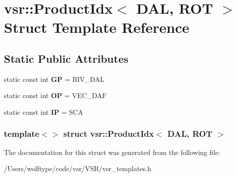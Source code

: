 \hypertarget{structvsr_1_1_product_idx_3_01_d_a_l_00_01_r_o_t_01_4}{\section{vsr\-:\-:Product\-Idx$<$ D\-A\-L, R\-O\-T $>$ Struct Template Reference}
\label{structvsr_1_1_product_idx_3_01_d_a_l_00_01_r_o_t_01_4}
}
\subsection*{Static Public Attributes}
\begin{DoxyCompactItemize}
\item 
\hypertarget{structvsr_1_1_product_idx_3_01_d_a_l_00_01_r_o_t_01_4_a36591015706e6aabcc73660864e1f78d}{static const int {\bfseries G\-P} = B\-I\-V\-\_\-\-D\-A\-L}\label{structvsr_1_1_product_idx_3_01_d_a_l_00_01_r_o_t_01_4_a36591015706e6aabcc73660864e1f78d}

\item 
\hypertarget{structvsr_1_1_product_idx_3_01_d_a_l_00_01_r_o_t_01_4_af5b7202d8acead7481998c81165f532b}{static const int {\bfseries O\-P} = V\-E\-C\-\_\-\-D\-A\-F}\label{structvsr_1_1_product_idx_3_01_d_a_l_00_01_r_o_t_01_4_af5b7202d8acead7481998c81165f532b}

\item 
\hypertarget{structvsr_1_1_product_idx_3_01_d_a_l_00_01_r_o_t_01_4_af611aaed9b24fcb1b7c36dc6ba5f0ef3}{static const int {\bfseries I\-P} = S\-C\-A}\label{structvsr_1_1_product_idx_3_01_d_a_l_00_01_r_o_t_01_4_af611aaed9b24fcb1b7c36dc6ba5f0ef3}

\end{DoxyCompactItemize}
\subsubsection*{template$<$$>$ struct vsr\-::\-Product\-Idx$<$ D\-A\-L, R\-O\-T $>$}



The documentation for this struct was generated from the following file\-:\begin{DoxyCompactItemize}
\item 
/\-Users/wolftype/code/vsr/\-V\-S\-R/vsr\-\_\-templates.\-h\end{DoxyCompactItemize}
